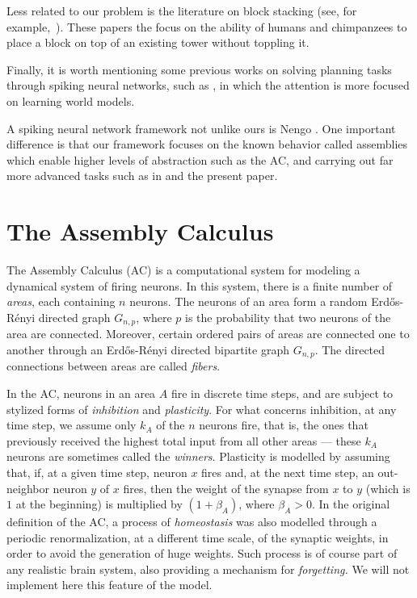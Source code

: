 \documentclass[letterpaper]{article}
\begin{document}
Less related to our problem is the  literature on block stacking (see, for example,~\cite{Hayashi2007,Tian2020}). These papers the focus on the ability of humans and chimpanzees to place a block on top of an existing tower without toppling it.

Finally, it is worth mentioning some previous works on solving planning tasks through spiking neural networks, such as \cite{rueckert2016,basanisi2020}, in which the attention is more focused on learning world models.

A spiking neural network framework not unlike ours is Nengo \cite{bekolay2014}. One important difference is that our framework focuses on the known behavior called assemblies which enable higher levels of abstraction such as the AC, and carrying out far more advanced tasks such as in \cite{mitropolsky_biologically_2021} and the present paper.

\section{The Assembly Calculus}\label{sec:ACintro}

The Assembly Calculus (AC) \cite{papadimitriou2020} is a computational system for modeling a dynamical system of firing neurons. In this system, there is a finite number of \textit{areas}, each containing $n$ neurons. The neurons of an area form a random Erd\H{o}s-R\'enyi directed graph $G_{n,p}$, where $p$ is the probability that two neurons of the area are connected. Moreover, certain ordered pairs of areas are  connected one to another through an Erd\H{o}s-R\'enyi directed bipartite graph $G_{n,p}$.  The directed connections between areas are called {\em fibers}.

In the AC, neurons in an area $A$ fire in discrete time steps, and are subject to stylized forms of {\em inhibition} and {\em plasticity}. For what concerns inhibition, at any time step, we assume only $k_A$ of the $n$ neurons fire, that is, the ones that previously received the highest total input from all other areas --- these $k_A$ neurons are sometimes called the {\em winners}. Plasticity is modelled by assuming that, if, at a given time step, neuron $x$ fires and, at the next time step, an out-neighbor neuron $y$ of $x$ fires, then the weight of the synapse from $x$ to $y$ (which is $1$ at the beginning) is multiplied by $(1+\beta_A)$, where $\beta_A>0$. 
In the original definition of the AC, a process of {\em homeostasis} was also modelled through a periodic renormalization, at a different time scale, of the synaptic weights, in order to avoid the generation of huge weights.  Such process is of course part of any realistic brain system, also providing a mechanism for {\em forgetting.} We will not implement here this feature of the model. 
\end{document}

